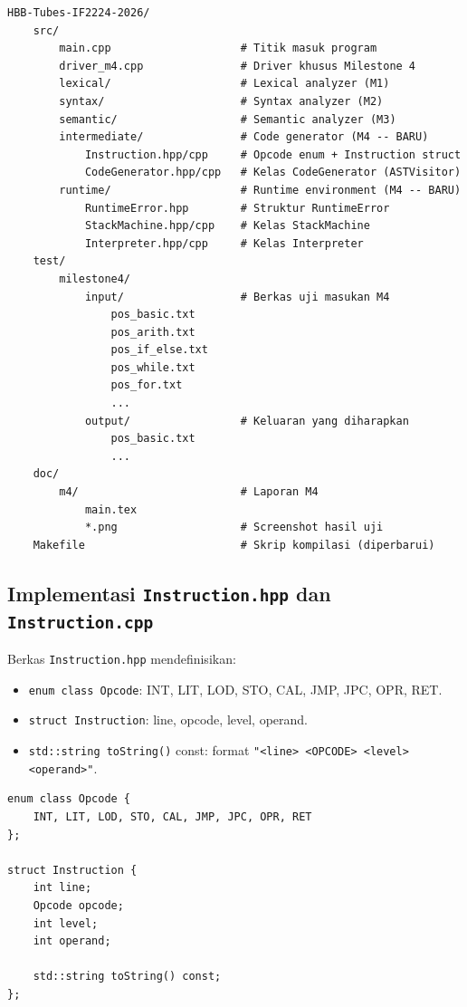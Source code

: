 \documentclass[12pt,a4paper]{article}
\begin{document}
\begin{lstlisting}[style=bash, caption={Tata letak direktori proyek}]
HBB-Tubes-IF2224-2026/
    src/
        main.cpp                    # Titik masuk program
        driver_m4.cpp               # Driver khusus Milestone 4
        lexical/                    # Lexical analyzer (M1)
        syntax/                     # Syntax analyzer (M2)
        semantic/                   # Semantic analyzer (M3)
        intermediate/               # Code generator (M4 -- BARU)
            Instruction.hpp/cpp     # Opcode enum + Instruction struct
            CodeGenerator.hpp/cpp   # Kelas CodeGenerator (ASTVisitor)
        runtime/                    # Runtime environment (M4 -- BARU)
            RuntimeError.hpp        # Struktur RuntimeError
            StackMachine.hpp/cpp    # Kelas StackMachine
            Interpreter.hpp/cpp     # Kelas Interpreter
    test/
        milestone4/
            input/                  # Berkas uji masukan M4
                pos_basic.txt
                pos_arith.txt
                pos_if_else.txt
                pos_while.txt
                pos_for.txt
                ...
            output/                 # Keluaran yang diharapkan
                pos_basic.txt
                ...
    doc/
        m4/                         # Laporan M4
            main.tex
            *.png                   # Screenshot hasil uji
    Makefile                        # Skrip kompilasi (diperbarui)
\end{lstlisting}

\subsection{Implementasi \texttt{Instruction.hpp} dan \texttt{Instruction.cpp}}

Berkas \texttt{Instruction.hpp} mendefinisikan:
\begin{itemize}
    \item \texttt{enum class Opcode}: INT, LIT, LOD, STO, CAL, JMP, JPC, OPR, RET.
    \item \texttt{struct Instruction}: line, opcode, level, operand.
    \item \texttt{std::string toString()} const: format \texttt{"<line> <OPCODE> <level> <operand>"}.
\end{itemize}

\begin{lstlisting}[style=cpp, caption={Deklarasi Instruction}]
enum class Opcode {
    INT, LIT, LOD, STO, CAL, JMP, JPC, OPR, RET
};

struct Instruction {
    int line;
    Opcode opcode;
    int level;
    int operand;
    
    std::string toString() const;
};
\end{lstlisting}
\end{document}
